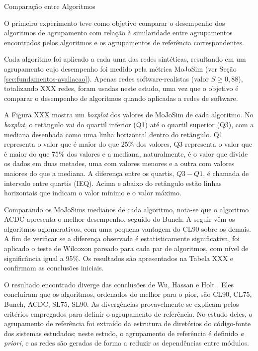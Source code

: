 \begin{section}{Comparação entre Algoritmos}

O primeiro experimento teve como objetivo comparar o desempenho dos algoritmos de agrupamento com relação à similaridade entre agrupamentos encontrados pelos algoritmos e os agrupamentos de referência correspondentes.

Cada algoritmo foi aplicado a cada uma das redes sintéticas, resultando em um agrupamento cujo desempenho foi medido pela métrica MoJoSim (ver Seção \ref{sec:fundamentos-avaliacao}). Apenas redes software-realistas (valor $S \ge 0,88$), totalizando XXX redes, foram usadas neste estudo, uma vez que o objetivo é comparar o desempenho de algoritmos quando aplicadas a redes de software.

A Figura XXX mostra um \emph{boxplot} dos valores de MoJoSim de cada algoritmo. No \emph{boxplot}, o retângulo vai do quartil inferior (Q1) até o quartil superior (Q3), com a mediana desenhada como uma linha horizontal dentro do retângulo. Q1 representa o valor que é maior do que 25\% dos valores, Q3 representa o valor que é maior do que 75\% dos valores e a mediana, naturalmente, é o valor que divide os dados em duas metades, uma com valores menores e a outra com valores maiores do que a mediana. A diferença entre os quartis, $Q3 - Q1$, é chamada de intervalo entre quartis (IEQ). Acima e abaixo do retângulo estão linhas horizontais que indicam o valor mínimo e o valor máximo. %

Comparando os MoJoSims medianos de cada algoritmo, nota-se que o algoritmo ACDC apresenta o melhor desempenho, seguido do Bunch. A seguir vêm os algoritmos aglomerativos, com uma pequena vantagem do CL90 sobre os demais. A fim de verificar se a diferença observada é estatisticamente significativa, foi aplicado o teste de Wilcoxon pareado para cada par de algoritmos, com nível de significância igual a 95\%. Os resultados são apresentados na Tabela XXX e confirmam as conclusões iniciais.

O resultado encontrado diverge das conclusões de Wu, Hassan e Holt \cite{Wu2005}. Eles concluíram que os algoritmos, ordenados do melhor para o pior, são CL90, CL75, Bunch, ACDC, SL75, SL90. As divergências provavelmente se explicam pelos critérios empregados para definir o agrupamento de referência. No estudo deles, o agrupamento de referência foi extraído da estrutura de diretórios do código-fonte dos sistemas estudados; neste estudo, o agrupamento de referência é definido \emph{a priori}, e as redes são geradas de forma a reduzir as dependências entre módulos.


\end{section}
